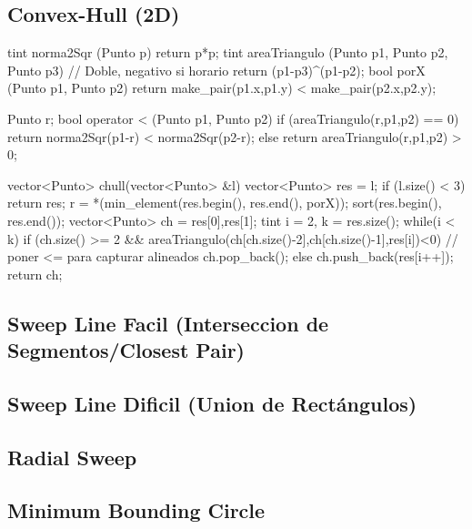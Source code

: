 \subsection{Convex-Hull (2D)}
\begin{code}
	
tint norma2Sqr (Punto p)
{
	return p*p;
}
tint areaTriangulo (Punto p1, Punto p2, Punto p3) // Doble, negativo si horario
{
	return (p1-p3)^(p1-p2);
}
bool porX (Punto p1, Punto p2)
{
	return make_pair(p1.x,p1.y) < make_pair(p2.x,p2.y);
}

Punto r;
bool operator < (Punto p1, Punto p2) 
{
	if (areaTriangulo(r,p1,p2) == 0)
		return norma2Sqr(p1-r) < norma2Sqr(p2-r);
	else
		return areaTriangulo(r,p1,p2) > 0;	
}	
	
vector<Punto> chull(vector<Punto> &l) 
{
	vector<Punto> res = l;
	if (l.size() < 3)
		return res;
	r = *(min_element(res.begin(), res.end(), porX));
	sort(res.begin(), res.end());
	vector<Punto> ch = {res[0],res[1]};  
	tint i = 2, k = res.size();
	while(i < k) 
		if (ch.size() >= 2 && areaTriangulo(ch[ch.size()-2],ch[ch.size()-1],res[i])<0) // poner <= para capturar alineados
			ch.pop_back();
		else 
			ch.push_back(res[i++]);
	return ch;
}
\end{code}

\subsection{Sweep Line Facil (Interseccion de Segmentos/Closest Pair)}
\begin{code}
\end{code}

\subsection{Sweep Line Dificil (Union de Rectángulos)}
\begin{code}
\end{code}

\subsection{Radial Sweep}
\begin{code}
\end{code}

\subsection{Minimum Bounding Circle}
\begin{code}
\end{code}

